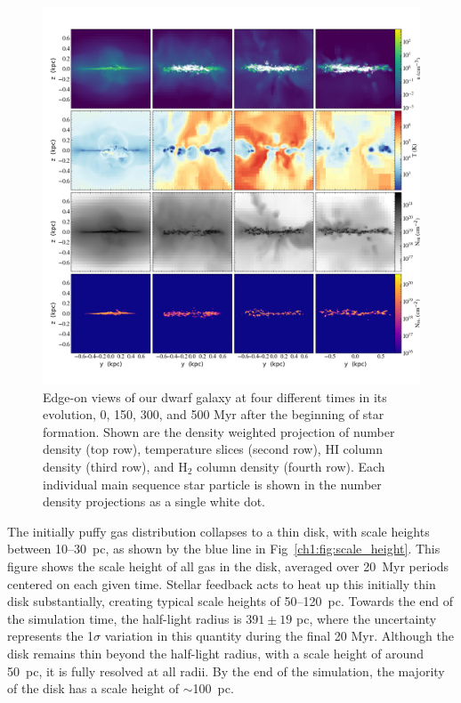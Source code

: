 \begin{figure}
\centering
\includegraphics[width=0.975\linewidth]{figures/ch1/multiplot_4x4_x.png}
\caption{Edge-on views of our dwarf galaxy at four different times in its evolution, 0, 150, 300, and 500 Myr after the beginning of star formation. Shown are the density weighted projection of number density (top row), temperature slices (second row), HI column density (third row), and H$_2$ column density (fourth row). Each individual main sequence star particle is shown in the number density projections as a single white dot.}
\label{ch1:fig:panel_x}
\end{figure}

The initially puffy gas distribution collapses to a thin disk, with scale heights between 10--30~pc, as shown by the blue line in Fig~\ref{ch1:fig:scale_height}. This figure shows the scale height of all gas in the disk, averaged over 20~Myr periods centered on each given time. Stellar feedback acts to heat up this initially thin disk substantially, creating typical scale heights of 50--120~pc. Towards the end of the simulation time, the half-light radius is $391 \pm 19$ pc, where the uncertainty represents the 1$\sigma$ variation in this quantity during the final 20 Myr. Although the disk remains thin beyond the half-light radius, with a scale height of around 50~pc, it is fully resolved at all radii. By the end of the simulation, the majority of the disk has a scale height of $\sim$100~pc.

